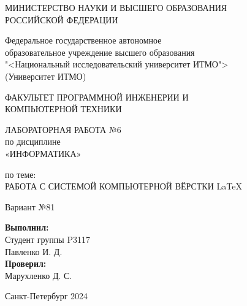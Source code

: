 \thispagestyle{empty}
\begin{center}
    МИНИСТЕРСТВО НАУКИ И ВЫСШЕГО ОБРАЗОВАНИЯ \\ РОССИЙСКОЙ ФЕДЕРАЦИИ

    \vspace{20pt}

    Федеральное государственное автономное \\ образовательное учреждение высшего образования \\
    "<Национальный исследовательский университет ИТМО"> \\
    (Университет ИТМО)

    \vspace{20pt}

    ФАКУЛЬТЕТ ПРОГРАММНОЙ ИНЖЕНЕРИИ И \\ КОМПЬЮТЕРНОЙ ТЕХНИКИ

\end{center}

\vfill

\begin{center}
    ЛАБОРАТОРНАЯ РАБОТА №6 \\  
    по дисциплине \\
    «ИНФОРМАТИКА»

    \vspace{10pt}

    по теме: \\
    РАБОТА С СИСТЕМОЙ КОМПЬЮТЕРНОЙ ВЁРСТКИ \LaTeX

    \vspace{10pt}

    Вариант №81
    
\end{center}

\vfill

\begin{flushright}
    \textbf{Выполнил:} \\
    Студент группы P3117 \\
    Павленко И. Д. \\
    \vspace{10pt}
    \textbf{Проверил:} \\
    Марухленко Д. С.



\end{flushright}

\vfill


\begin{center}
    Санкт-Петербург 2024
\end{center}

